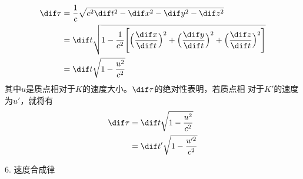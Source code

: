 \documentclass[../outline-of-mechanics.tex]{subfiles}
\begin{document}
~\vspace{-1.56em}
{\setlength{\mathindent}{4em}
  \begin{equation}\label{eqn:11.05.07}
    \begin{aligned}
      \dif \tau & =\frac{1}{c} \sqrt{c^{2} \dif t^{2}- \dif x^{2}- \dif y^{2}- \dif z^{2}}                                                                                       \\
                & = \dif t \sqrt{1-\frac{1}{c^{2}}\Bigg[\Big(\frac{ \dif x}{ \dif t}\Big)^{2}+\Big(\frac{ \dif y}{ \dif t}\Big)^{2}+\Big(\frac{ \dif z}{ \dif t}\Big)^{2}\Bigg]} \\
                & = \dif t \sqrt{1-\frac{u^{2}}{c^{2}}}
    \end{aligned}
  \end{equation}}
其中$ u $是质点相对于$ K $的速度大小。$ \dif \tau $的绝对性表明，若质点相
对于$ K ' $的速度为$ u ' $，就将有
\begin{equation*}
  \begin{aligned}
    \dif \tau & = \dif t \sqrt{1-\frac{u^{2}}{c^{2}}}                 \\
              & = \dif t^{\prime} \sqrt{1-\frac{u^{\prime 2}}{c^{2}}}
  \end{aligned}
\end{equation*}

\textsf{6. 速度合成律}
\end{document}
